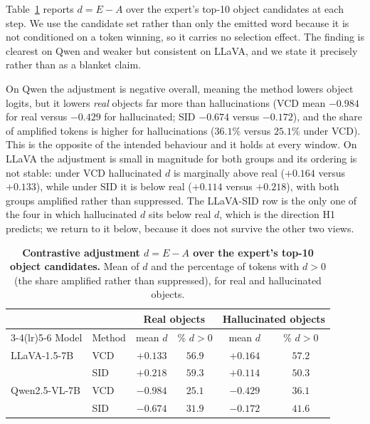 \documentclass{article}
\begin{document}
Table~\ref{tab:dproxy-top10} reports $d = E - A$ over the expert's top-10 object
candidates at each step. We use the candidate set rather than only the emitted
word because it is not conditioned on a token winning, so it carries no selection
effect. The finding is clearest on Qwen and weaker but consistent on LLaVA, and
we state it precisely rather than as a blanket claim.

On Qwen the adjustment is negative overall, meaning the method lowers object
logits, but it lowers \emph{real} objects far more than hallucinations (VCD mean
$-0.984$ for real versus $-0.429$ for hallucinated; SID $-0.674$ versus
$-0.172$), and the share of amplified tokens is higher for hallucinations
($36.1\%$ versus $25.1\%$ under VCD). This is the opposite of the intended
behaviour and it holds at every window. On LLaVA the adjustment is small in
magnitude for both groups and its ordering is not stable: under VCD hallucinated
$d$ is marginally above real ($+0.164$ versus $+0.133$), while under SID it is
below real ($+0.114$ versus $+0.218$), with both groups amplified rather than
suppressed. The LLaVA-SID row is the only one of the four in which hallucinated
$d$ sits below real $d$, which is the direction H1 predicts; we return to it
below, because it does not survive the other two views.

\begin{table}[t]
\centering
\small
\setlength{\tabcolsep}{5pt}
\caption{\textbf{Contrastive adjustment $d = E - A$ over the expert's top-10
object candidates.} Mean of $d$ and the percentage of tokens with $d > 0$ (the
share amplified rather than suppressed), for real and hallucinated objects.}
\label{tab:dproxy-top10}
\begin{tabular}{ll cc cc}
\toprule
& & \multicolumn{2}{c}{Real objects} & \multicolumn{2}{c}{Hallucinated objects} \\
\cmidrule(lr){3-4}\cmidrule(lr){5-6}
Model & Method & mean $d$ & \% $d\!>\!0$ & mean $d$ & \% $d\!>\!0$ \\
\midrule
LLaVA-1.5-7B & VCD & $+0.133$ & $56.9$ & $+0.164$ & $57.2$ \\
 & SID & $+0.218$ & $59.3$ & $+0.114$ & $50.3$ \\
Qwen2.5-VL-7B & VCD & $-0.984$ & $25.1$ & $-0.429$ & $36.1$ \\
 & SID & $-0.674$ & $31.9$ & $-0.172$ & $41.6$ \\
\bottomrule
\end{tabular}
\end{table}
\end{document}
